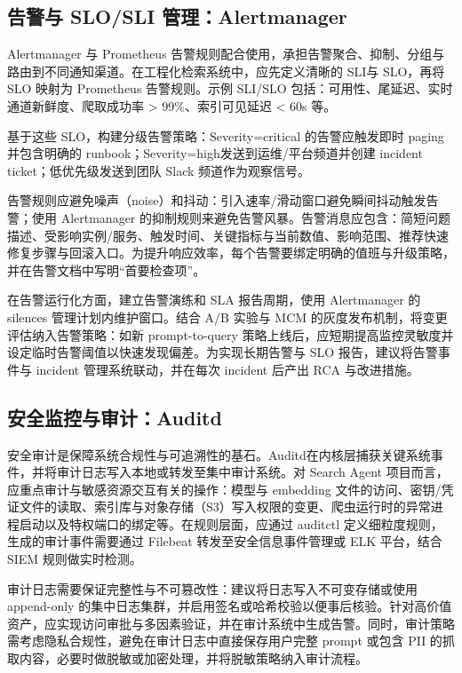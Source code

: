 \subsection{告警与 SLO/SLI 管理：Alertmanager}
Alertmanager\cite{Majors2022Observability} 与 Prometheus 告警规则配合使用，承担告警聚合、抑制、分组与路由到不同通知渠道。在工程化检索系统中，应先定义清晰的 SLI与 SLO，再将 SLO 映射为 Prometheus 告警规则。示例 SLI/SLO 包括：可用性、尾延迟、实时通道新鲜度、爬取成功率 > 99\%、索引可见延迟 < 60s 等。

基于这些 SLO，构建分级告警策略：Severity=critical 的告警应触发即时 paging并包含明确的 runbook；Severity=high发送到运维/平台频道并创建 incident ticket；低优先级发送到团队 Slack 频道作为观察信号。

告警规则应避免噪声（noise）和抖动：引入速率/滑动窗口避免瞬间抖动触发告警；使用 Alertmanager 的抑制规则来避免告警风暴。告警消息应包含：简短问题描述、受影响实例/服务、触发时间、关键指标与当前数值、影响范围、推荐快速修复步骤与回滚入口。为提升响应效率，每个告警要绑定明确的值班与升级策略，并在告警文档中写明“首要检查项”。

在告警运行化方面，建立告警演练和 SLA 报告周期，使用 Alertmanager 的 silences 管理计划内维护窗口。结合 A/B 实验与 MCM 的灰度发布机制，将变更评估纳入告警策略：如新 prompt-to-query 策略上线后，应短期提高监控灵敏度并设定临时告警阈值以快速发现偏差。为实现长期告警与 SLO 报告，建议将告警事件与 incident 管理系统联动，并在每次 incident 后产出 RCA 与改进措施。

\subsection{安全监控与审计：Auditd}
安全审计是保障系统合规性与可追溯性的基石。Auditd\cite{Serverspace2025Auditd}在内核层捕获关键系统事件，并将审计日志写入本地或转发至集中审计系统。对 Search Agent 项目而言，应重点审计与敏感资源交互有关的操作：模型与 embedding 文件的访问、密钥/凭证文件的读取、索引库与对象存储（S3）写入权限的变更、爬虫运行时的异常进程启动以及特权端口的绑定等。在规则层面，应通过 auditctl 定义细粒度规则，生成的审计事件需要通过 Filebeat 转发至安全信息事件管理或 ELK 平台，结合 SIEM 规则做实时检测。

审计日志需要保证完整性与不可篡改性：建议将日志写入不可变存储或使用 append-only 的集中日志集群，并启用签名或哈希校验以便事后核验。针对高价值资产，应实现访问审批与多因素验证，并在审计系统中生成告警。同时，审计策略需考虑隐私合规性，避免在审计日志中直接保存用户完整 prompt 或包含 PII 的抓取内容，必要时做脱敏或加密处理，并将脱敏策略纳入审计流程。

